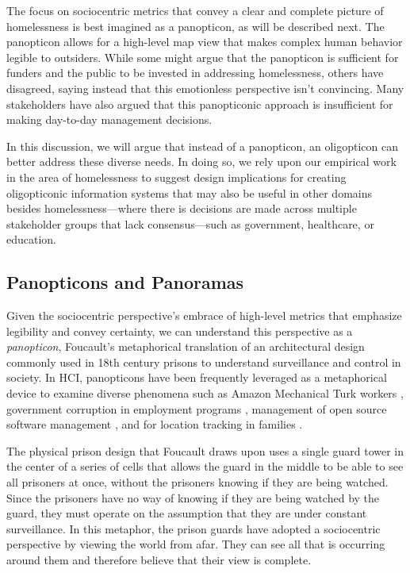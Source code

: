 The focus on sociocentric metrics that convey a clear and complete picture of homelessness is best imagined as a panopticon, as will be described next. The panopticon allows for a high-level map view that makes complex human behavior legible to outsiders. While some might argue that the panopticon is sufficient for funders and the public to be invested in addressing homelessness, others have disagreed, saying instead that this emotionless perspective isn't convincing. Many stakeholders have also argued that this panopticonic approach is insufficient for making day-to-day management decisions.

In this discussion, we will argue that instead of a panopticon, an oligopticon can better address these diverse needs. In doing so, we rely upon our empirical work in the area of homelessness to suggest design implications for creating oligopticonic information systems that may also be useful in other domains besides homelessness---where there is decisions are made across multiple stakeholder groups that lack consensus---such as government, healthcare, or education.

\subsection{Panopticons and Panoramas}
Given the sociocentric perspective's embrace of high-level metrics that emphasize legibility and convey certainty, we can understand this perspective as a \textit{panopticon}, Foucault's \citeyearpar{Foucault1977Discipline} metaphorical translation of an architectural design commonly used in 18th century prisons to understand surveillance and control in society. In HCI, panopticons have been frequently leveraged as a metaphorical device to examine diverse phenomena such as Amazon Mechanical Turk workers \citep{Irani2013Turk}, government corruption in employment programs \citep{Veeraraghavan2013Pan}, management of open source software management \citep{Ikonen2010OSS}, and for location tracking in families \citep{Boesen2010Domestic}.

The physical prison design that Foucault draws upon uses a single guard tower in the center of a series of cells that allows the guard in the middle to be able to see all prisoners at once, without the prisoners knowing if they are being watched. Since the prisoners have no way of knowing if they are being watched by the guard, they must operate on the assumption that they are under constant surveillance. In this metaphor, the prison guards have adopted a sociocentric perspective by viewing the world from afar. They can see all that is occurring around them and therefore believe that their view is complete.

